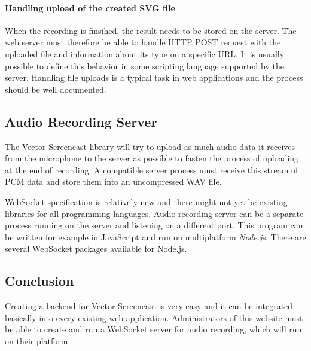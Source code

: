 \paragraph{Handling upload of the created SVG file}
When the recording is finsihed, the result needs to be stored on the server. The web server must therefore be able to handle HTTP POST request with the uploaded file and information about its type on a specific URL. It is usually possible to define this behavior in some scripting language supported by the server. Handling file uploads is a typical task in web applications and the process should be well documented.

\subsection{Audio Recording Server}
The Vector Screencast library will try to upload as much audio data it receives from the microphone to the server as possible to fasten the process of uploading at the end of recording. A compatible server process must receive this stream of PCM data and store them into an uncompressed WAV file.

WebSocket specification is relatively new and there might not yet be existing libraries for all programming languages. Audio recording server can be a separate process running on the server and listening on a different port. This program can be written for example in JavaScript and run on multiplatform \textit{Node.js}. There are several WebSocket packages available for Node.js.

\subsection{Conclusion}
Creating a backend for Vector Screencast is very easy and it can be integrated basically into every existing web application. Administrators of this website must be able to create and run a WebSocket server for audio recording, which will run on their platform.